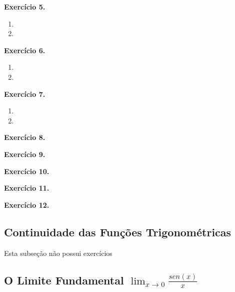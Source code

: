 \documentclass[12pt,a4paper]{article}
\begin{document}
\vspace{0.5cm}
\noindent\textbf{Exercício 5.}
\begin{enumerate}
    \renewcommand{\theenumi}{\alph{enumi}}
    \renewcommand{\labelenumi}{\theenumi)}
    \item 
    \item 
\end{enumerate}

\vspace{0.5cm}
\noindent\textbf{Exercício 6.}
\begin{enumerate}
    \renewcommand{\theenumi}{\alph{enumi}}
    \renewcommand{\labelenumi}{\theenumi)}
    \item 
    \item 
\end{enumerate}

\vspace{0.5cm}
\noindent\textbf{Exercício 7.}
\begin{enumerate}
    \renewcommand{\theenumi}{\alph{enumi}}
    \renewcommand{\labelenumi}{\theenumi)}
    \item 
    \item 
\end{enumerate}

\vspace{0.5cm}
\noindent\textbf{Exercício 8.}

\vspace{0.5cm}
\noindent\textbf{Exercício 9.}

\vspace{0.5cm}
\noindent\textbf{Exercício 10.}

\vspace{0.5cm}
\noindent\textbf{Exercício 11.}

\vspace{0.5cm}
\noindent\textbf{Exercício 12.}

\subsection{Continuidade das Funções Trigonométricas}
Esta subseção não possui exercícios

\subsection{O Limite Fundamental $\lim_{x \to 0} \frac{sen(x)}{x}$}
\end{document}
